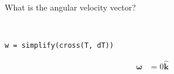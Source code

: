 What is the angular velocity vector?

\begin{solution} \
\begin{lstlisting}
w = simplify(cross(T, dT))
\end{lstlisting}

\begin{align*}
    \boldsymbol{\omega} &= 0 \hat{\boldsymbol{k}}
\end{align*}
\end{solution}